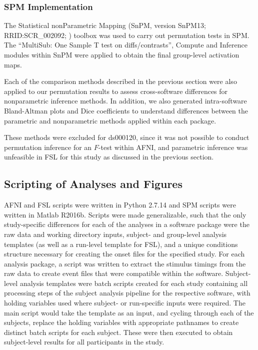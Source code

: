 \subsubsection{SPM Implementation}
The Statistical nonParametric Mapping (SnPM, version SnPM13; RRID:SCR\_002092; \citep{Nichols2002-kf}) toolbox was used to carry out permutation tests in SPM. The ``MultiSub: One Sample T test on diffs/contrasts'', Compute and Inference modules within SnPM were applied to obtain the final group-level activation maps.

Each of the comparison methods described in the previous section were also applied to our permutation results to assess cross-software differences for nonparametric inference methods. In addition, we also generated intra-software Bland-Altman plots and Dice coefficients to understand differences between the parametric and nonparametric methods applied within each package. 

These methods were excluded for ds000120, since it was not possible to conduct permutation inference for an $F$-test within AFNI, and parametric inference was unfeasible in FSL for this study as discussed in the previous section. 

\subsection{Scripting of Analyses and Figures}
AFNI and FSL scripts were written in Python 2.7.14 and SPM scripts were written in Matlab R2016b. Scripts were made generalizable, such that the only study-specific differences for each of the analyses in a software package were the raw data and working directory inputs, subject- and group-level analysis templates (as well as a run-level template for FSL), and a unique conditions structure necessary for creating the onset files for the specified study. For each analysis package, a script was written to extract the stimulus timings from the raw data to create event files that were compatible within the software. Subject-level analysis templates were batch scripts created for each study containing all processing steps of the subject analysis pipeline for the respective software, with holding variables used where subject- or run-specific inputs were required. The main script would take the template as an input, and cycling through each of the subjects, replace the holding variables with appropriate pathnames to create distinct batch scripts for each subject. These were then executed to obtain subject-level results for all participants in the study. 

